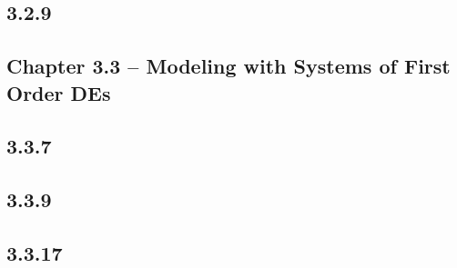 \documentclass{article}
\begin{document}
\subsection{3.2.9}

\subsection{Chapter 3.3 -- Modeling with Systems of First Order DEs}

\subsection{3.3.7}
\subsection{3.3.9}
\subsection{3.3.17}
\end{document}
